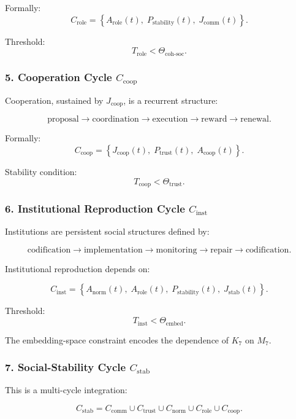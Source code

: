 Formally:
\[
  C_{\mathrm{role}}
  =
  \left\{
     A_{\mathrm{role}}(t),\;
     P_{\mathrm{stability}}(t),\;
     J_{\mathrm{comm}}(t)
  \right\}.
\]

Threshold:
\[
  T_{\mathrm{role}} < \Theta_{\mathrm{coh\text{-}soc}}.
\]

\subsubsection{5. Cooperation Cycle $C_{\mathrm{coop}}$}

Cooperation, sustained by $J_{\mathrm{coop}}$, is a recurrent structure:

\[
 \mathrm{proposal}
 \to
 \mathrm{coordination}
 \to
 \mathrm{execution}
 \to
 \mathrm{reward}
 \to
 \mathrm{renewal}.
\]

Formally:
\[
 C_{\mathrm{coop}}=
 \left\{
   J_{\mathrm{coop}}(t),\;
   P_{\mathrm{trust}}(t),\;
   A_{\mathrm{coop}}(t)
 \right\}.
\]

Stability condition:
\[
 T_{\mathrm{coop}} < \Theta_{\mathrm{trust}}.
\]

\subsubsection{6. Institutional Reproduction Cycle $C_{\mathrm{inst}}$}

Institutions are persistent social structures defined by:

\[
  \mathrm{codification}
  \to
  \mathrm{implementation}
  \to
  \mathrm{monitoring}
  \to
  \mathrm{repair}
  \to
  \mathrm{codification}.
\]

Institutional reproduction depends on:

\[
 C_{\mathrm{inst}}
 =
 \left\{
   A_{\mathrm{norm}}(t),\;
   A_{\mathrm{role}}(t),\;
   P_{\mathrm{stability}}(t),\;
   J_{\mathrm{stab}}(t)
 \right\}.
\]

Threshold:
\[
 T_{\mathrm{inst}} < \Theta_{\mathrm{embed}}.
\]

The embedding-space constraint encodes the dependence of
$K_7$ on $M_7$.

\subsubsection{7. Social-Stability Cycle $C_{\mathrm{stab}}$}

This is a multi-cycle integration:

\[
  C_{\mathrm{stab}}
    =
    C_{\mathrm{comm}}
    \cup
    C_{\mathrm{trust}}
    \cup
    C_{\mathrm{norm}}
    \cup
    C_{\mathrm{role}}
    \cup
    C_{\mathrm{coop}}.
\]

